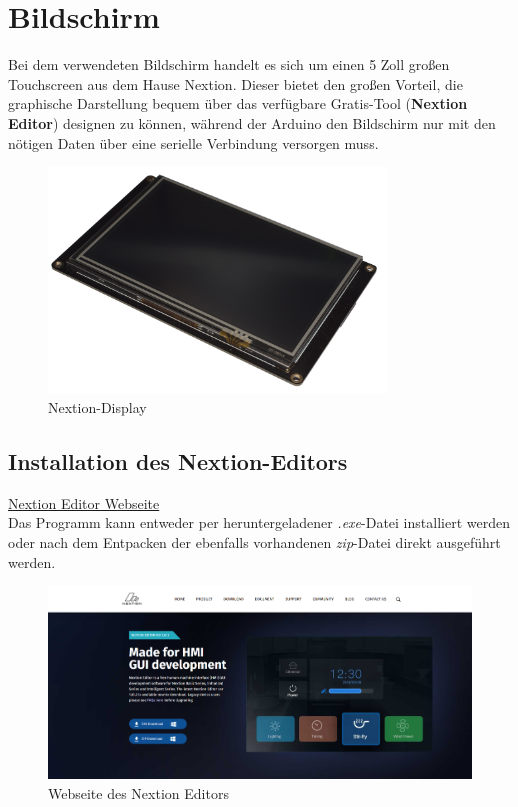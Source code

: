 \section{Bildschirm}
Bei dem verwendeten Bildschirm handelt es sich um einen 5 Zoll großen Touchscreen aus dem Hause Nextion.
Dieser bietet den großen Vorteil, die graphische Darstellung bequem über das verfügbare Gratis-Tool (\textbf{Nextion Editor}) designen zu können, während der Arduino den Bildschirm nur mit den nötigen Daten über eine serielle Verbindung versorgen muss. 

\begin{figure}[h]
    \centering
    \includegraphics[width=0.8\textwidth]{Fotos/Nextion_Display.png}
    \caption{Nextion-Display}
\end{figure}

\newpage
\subsection{Installation des Nextion-Editors}
\href{https://nextion.tech/nextion-editor/}{Nextion Editor Webseite}\\
Das Programm kann entweder per heruntergeladener \textit{.exe}-Datei installiert werden oder nach dem Entpacken der ebenfalls vorhandenen \textit{zip}-Datei direkt ausgeführt werden.
\begin{figure}[h]
    \centering
    \includegraphics[width=1\textwidth]{bilder/Nextion_Webseite.png}
    \caption{Webseite des Nextion Editors}
\end{figure}

